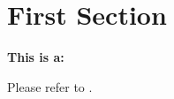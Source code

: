 \documentclass[AIAA]{nasa-latex-docs}
\begin{document}
\section{First Section}

\textbf{This is a: \docTypeName}

Please refer to \cite{Template-Guide}.
\end{document}
